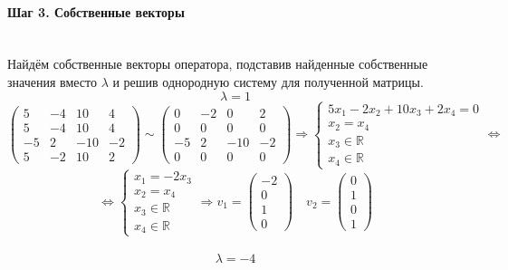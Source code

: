 \documentclass{article}
\newcommand{\la}{\lambda}
\begin{document}
\paragraph*{Шаг 3. Собственные векторы} \, \\
Найдём собственные векторы оператора, подставив найденные собственные значения вместо $\la$ и решив однородную систему для полученной матрицы.
$$\la = 1$$
$$\begin{pmatrix}
5 & -4 & 10 & 4 \\
5 & -4 & 10 & 4 \\
-5 & 2 & -10 & -2 \\
5 & -2 & 10 & 2
\end{pmatrix} \sim \begin{pmatrix}
0 & -2 & 0 & 2 \\
0 & 0 & 0 & 0 \\
-5 & 2 & -10 & -2 \\
0 & 0 & 0 & 0
\end{pmatrix} \Rightarrow \begin{cases}
5x_1 - 2x_2 + 10x_3 + 2x_4 = 0 \\
x_2 = x_4 \\
x_3 \in \mathbb{R} \\
x_4 \in \mathbb{R}
\end{cases} \Leftrightarrow $$
$$\Leftrightarrow \begin{cases}
x_1 = -2x_3 \\
x_2 = x_4 \\
x_3 \in \mathbb{R} \\
x_4 \in \mathbb{R}
\end{cases} \Rightarrow v_1=\begin{pmatrix}-2 \\ 0 \\ 1 \\ 0\end{pmatrix} \quad v_2=\begin{pmatrix}0 \\ 1 \\ 0 \\ 1\end{pmatrix}$$ \\
$$\la = -4$$
\end{document}
